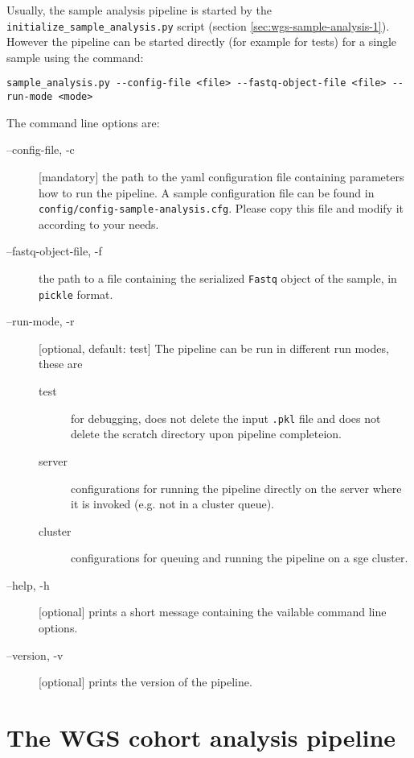 \documentclass[a4paper]{article}
\begin{document}
Usually, the sample analysis pipeline is started by the
\texttt{initialize\_sample\_analysis.py} script (section
\ref{sec:wgs-sample-analysis-1}). However the pipeline can be started
directly (for example for tests) for a single sample using the
command:


\begin{lstlisting}
sample_analysis.py --config-file <file> --fastq-object-file <file> --run-mode <mode>
\end{lstlisting}

The command line options are:

\begin{description}
\item[--config-file, -c] [mandatory] the path to the yaml
  configuration file containing parameters how to run the pipeline. A
  sample configuration file can be found in
  \texttt{config/config-sample-analysis.cfg}. Please copy this file
  and modify it according to your needs.
\item[--fastq-object-file, -f] the path to a file containing the
  serialized \texttt{Fastq} object of the sample, in \texttt{pickle}
  format.
\item[--run-mode, -r] [optional, default: test] The pipeline can be
  run in different run modes, these are 

  \begin{description}
  \item[test] for debugging, does not delete the input \texttt{.pkl}
    file and does not delete the scratch directory upon pipeline
    completeion.
  \item[server] configurations for running the pipeline directly on
    the server where it is invoked (e.g. not in a cluster queue).
  \item[cluster] configurations for queuing and running the pipeline
    on a sge cluster.
  \end{description}
    
\item[--help, -h] [optional] prints a short message containing the
  vailable command line options.

\item[--version, -v] [optional] prints the version of the pipeline.

\end{description}


\section{The WGS cohort analysis pipeline}
\label{sec:wgs-cohort-analysis}
\end{document}
